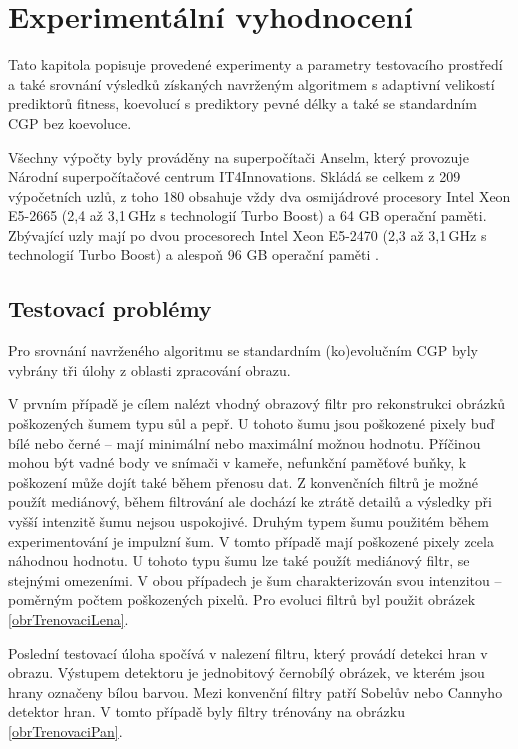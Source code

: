 \chapter{Experimentální vyhodnocení}
\label{chExperiments}

Tato kapitola popisuje provedené experimenty a parametry testovacího prostředí a také srovnání výsledků získaných navrženým algoritmem s adaptivní velikostí prediktorů fitness, koevolucí s prediktory pevné délky a také se standardním CGP bez koevoluce.

Všechny výpočty byly prováděny na superpočítači Anselm, který provozuje Národní superpočítačové centrum IT4Innovations. Skládá se celkem z 209 výpočetních uzlů, z toho 180 obsahuje vždy dva osmijádrové procesory Intel Xeon E5-2665 (2,4 až 3,1\,GHz s technologií Turbo Boost) a 64 GB operační paměti. Zbývající uzly mají po dvou procesorech Intel Xeon E5-2470 (2,3 až 3,1\,GHz s technologií Turbo Boost) a alespoň 96 GB operační paměti \cite{AnselmSpecs}.

\section{Testovací problémy}

Pro srovnání navrženého algoritmu se standardním (ko)evolučním CGP byly vybrány tři úlohy z oblasti zpracování obrazu.

V prvním případě je cílem nalézt vhodný obrazový filtr pro rekonstrukci obrázků poškozených šumem typu sůl a pepř. U tohoto šumu jsou poškozené pixely buď bílé nebo černé -- mají minimální nebo maximální možnou hodnotu. Příčinou mohou být vadné body ve snímači v kameře, nefunkční paměťové buňky, k poškození může dojít také během přenosu dat. Z konvenčních filtrů je možné použít mediánový, během filtrování ale dochází ke ztrátě detailů a výsledky při vyšší intenzitě šumu nejsou uspokojivé. Druhým typem šumu použitém během experimentování je impulzní šum. V tomto případě mají poškozené pixely zcela náhodnou hodnotu. U tohoto typu šumu lze také použít mediánový filtr, se stejnými omezeními. V obou případech je šum charakterizován svou intenzitou -- poměrným počtem poškozených pixelů. Pro evoluci filtrů byl použit obrázek \ref{obrTrenovaciLena}.

Poslední testovací úloha spočívá v nalezení filtru, který provádí detekci hran v obrazu. Výstupem detektoru je jednobitový černobílý obrázek, ve kterém jsou hrany označeny bílou barvou. Mezi konvenční filtry patří Sobelův nebo Cannyho detektor hran. V tomto případě byly filtry trénovány na obrázku \ref{obrTrenovaciPan}.

